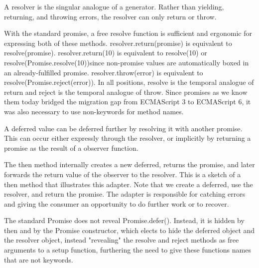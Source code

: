 A resolver is the singular analogue of a generator. Rather than yielding, returning, and throwing errors, the resolver can only return or throw.

With the standard promise, a free resolve function is sufficient and ergonomic for expressing both of these methods. resolver.return(promise) is equivalent to resolve(promise). resolver.return(10) is equivalent to resolve(10) or resolve(Promise.resolve(10))since non-promise values are automatically boxed in an already-fulfilled promise. resolver.throw(error) is equivalent to resolve(Promise.reject(error)). In all positions, resolve is the temporal analogue of return and reject is the temporal analogue of throw. Since promises as we know them today bridged the migration gap from ECMAScript 3 to ECMAScript 6, it was also necessary to use non-keywords for method names.

A deferred value can be deferred further by resolving it with another promise. This can occur either expressly through the resolver, or implicitly by returning a promise as the result of a observer function.

The then method internally creates a new deferred, returns the promise, and later forwards the return value of the observer to the resolver. This is a sketch of a then method that illustrates this adapter. Note that we create a deferred, use the resolver, and return the promise. The adapter is responsible for catching errors and giving the consumer an opportunity to do further work or to recover.

The standard Promise does not reveal Promise.defer(). Instead, it is hidden by then and by the Promise constructor, which elects to hide the deferred object and the resolver object, instead "revealing" the resolve and reject methods as free arguments to a setup function, furthering the need to give these functions names that are not keywords.

